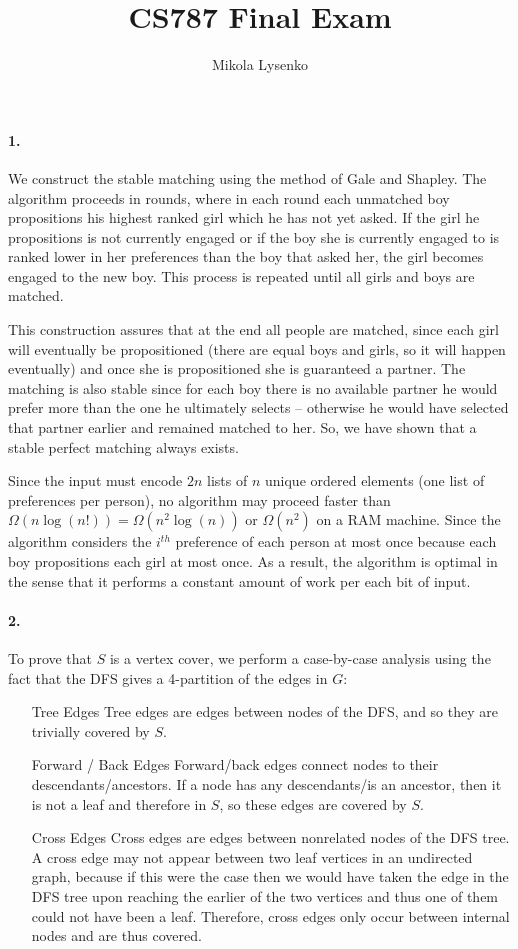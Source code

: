 \documentclass{article}
\title{CS787 Final Exam}
\author{Mikola Lysenko}
\begin{document}
\maketitle{}


\paragraph{1.} We construct the stable matching using the method of Gale and Shapley.  The algorithm proceeds in rounds, where in each round each unmatched boy propositions his highest ranked girl which he has not yet asked.  If the girl he propositions is not currently engaged or if the boy she is currently engaged to is ranked lower in her preferences than the boy that asked her, the girl becomes engaged to the new boy.  This process is repeated until all girls and boys are matched.

This construction assures that at the end all people are matched, since each girl will eventually be propositioned (there are equal boys and girls, so it will happen eventually) and once she is propositioned she is guaranteed a partner.  The matching is also stable since for each boy there is no available partner he would prefer more than the one he ultimately selects -- otherwise he would have selected that partner earlier and remained matched to her.  So, we have shown that a stable perfect matching always exists.

Since the input must encode $2n$ lists of $n$ unique ordered elements (one list of preferences per person), no algorithm may proceed faster than $\Omega(n \log(n!)) = \Omega(n^2 \log(n))$ or $\Omega(n^2)$ on a RAM machine.  Since the algorithm considers the $i^{th}$ preference of each person at most once because each boy propositions each girl at most once.  As a result, the algorithm is optimal in the sense that it performs a constant amount of work per each bit of input.

\paragraph{2.}
To prove that $S$ is a vertex cover, we perform a case-by-case analysis using the fact that the DFS gives a 4-partition of the edges in $G$:
\begin{itemize}
\item[Tree Edges] Tree edges are edges between nodes of the DFS, and so they are trivially covered by $S$.
\item[Forward / Back Edges] Forward/back edges connect nodes to their descendants/ancestors.  If a node has any descendants/is an ancestor, then it is not a leaf and therefore in $S$, so these edges are covered by $S$.
\item[Cross Edges] Cross edges are edges between nonrelated nodes of the DFS tree.  A cross edge may not appear between two leaf vertices in an undirected graph, because if this were the case then we would have taken the edge in the DFS tree upon reaching the earlier of the two vertices and thus one of them could not have been a leaf.  Therefore, cross edges only occur between internal nodes and are thus covered.
\end{itemize}
\end{document}
